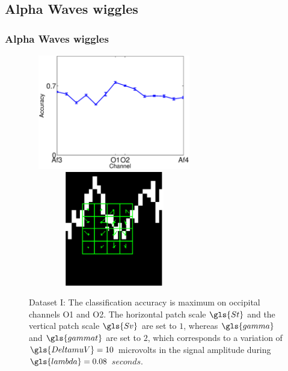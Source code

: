 \documentclass[aspectratio=169]{beamer}
\begin{document}
\subsection{Alpha Waves wiggles}
\begin{frame}
\frametitle{Alpha Waves wiggles}
\begin{figure}[h!]
\centering
\includegraphics[width=7.5cm, height=5cm]{images/Dataset1AccuracyPerChannel}
\includegraphics[width=7.5cm, height=5cm]{images/AlphaWaveSampleEEG.png}
\caption[Dataset I Classification Rate]{Dataset I: The classification accuracy is maximum on occipital channels O1 and O2. The horizontal patch scale $\gls{St}$ and the vertical patch scale $\gls{Sv}$ are set to $1$, whereas $\gls{gamma}$ and $\gls{gammat}$ are set to $2$, which corresponds to a variation of $\gls{DeltamuV} = 10$ microvolts in the signal amplitude during $\gls{lambda}=0.08$ $\si{seconds}$.}
\label{fig:alpharesultsdataseti}
\end{figure}
\end{frame}
\end{document}
